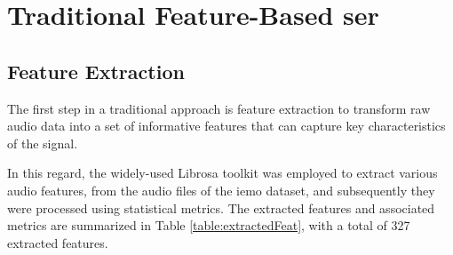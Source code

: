 \section{Traditional Feature-Based \ac{ser}}


\subsection{Feature Extraction}

The first step in a traditional approach is feature extraction to transform raw audio data into a set of informative features that can capture key characteristics of the signal.

In this regard, the widely-used Librosa toolkit was employed to extract various audio features, from the audio files of the \ac{iemo} dataset, and subsequently they were processed using statistical metrics. The extracted features and associated metrics are summarized in Table \ref{table:extractedFeat}, with a total of 327 extracted features.

